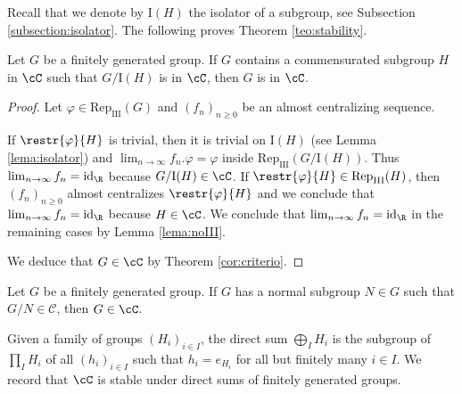 \documentclass[reqno]{amsart}
\begin{document}
Recall that we denote by $\mathrm{I}(H)$ the isolator of a subgroup, see Subsection \ref{subsection:isolator}. The following proves Theorem  \ref{teo:stability}.
\begin{teo} \label{teo:extension}
Let $G$ be a finitely generated group. If $G$ contains a commensurated subgroup $H$ in $\cC$ such that $G/\mathrm{I}(H)$ is in $\cC$, then $G$ is in $\cC$.
\end{teo}
\begin{proof}
Let $\varphi \in \mathrm{Rep}_\mathrm{III}(G)$ and $(f_n)_{n \geq 0}$ be an almost centralizing sequence.

If $\restr{\varphi}{H}$ is trivial, then it is trivial on $\mathrm{I}(H)$ (see Lemma \ref{lema:isolator}) and $\lim_{n \to \infty} f_n.\varphi = \varphi$ inside $\mathrm{Rep}_\mathrm{III}(G/\mathrm{I}(H))$. Thus $\lim_{n \to \infty} f_n = \mathrm{id}_\R$ because $G/\mathrm{I}(H)\in \cC$. If $\restr{\varphi}{H} \in \mathrm{Rep}_\mathrm{III}(H)$, then  $(f_n)_{n \geq 0}$ almost centralizes $\restr{\varphi}{H}$ and we conclude that $\lim_{n \to \infty} f_n = \mathrm{id}_\R$ because $H \in \cC$. We conclude that $\lim_{n \to \infty} f_n = \mathrm{id}_\R$ in the remaining cases by Lemma \ref{lema:noIII}. 

We deduce that $G \in \cC$ by Theorem \ref{cor:criterio}.
\end{proof}
\begin{cor}\label{cor:extension}
    Let $G$ be a finitely generated group. If $G$ has a normal subgroup $N\in G$ such that $G/N\in \mathcal{C}$, then $G\in \cC$.
\end{cor}


Given a family of groups $(H_i)_{i\in I}$, the direct sum $\bigoplus_I H_i$ is the subgroup of $\prod_I H_i$ of all $(h_i)_{i\in I}$ such that $h_i=e_{H_i}$ for all but finitely many $i \in I$. We record that $\cC$ is stable under direct sums of finitely generated groups.
\end{document}
